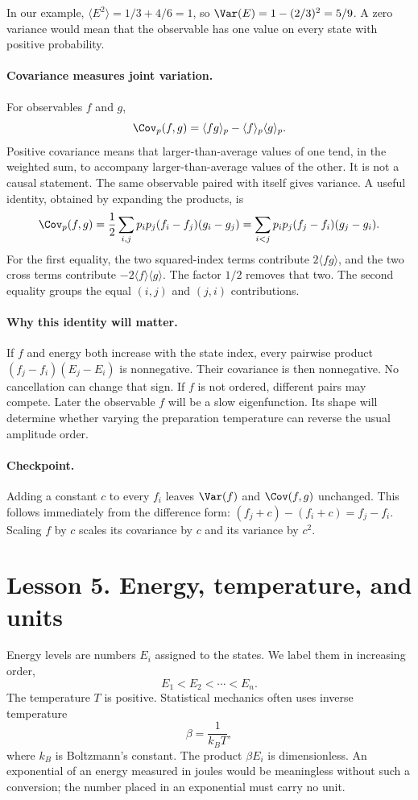 In our example, $\langle E^2\rangle=1/3+4/6=1$, so
$\Var(E)=1-(2/3)^2=5/9$. A zero variance would mean that the observable has
one value on every state with positive probability.

\paragraph{Covariance measures joint variation.}
For observables $f$ and $g$,
\[
\Cov_p(f,g)=\langle fg\rangle_p-\langle f\rangle_p\langle g\rangle_p.
\]
Positive covariance means that larger-than-average values of one tend, in the
weighted sum, to accompany larger-than-average values of the other. It is not
a causal statement. The same observable paired with itself gives variance.
A useful identity, obtained by expanding the products, is
\[
\Cov_p(f,g)=\frac12\sum_{i,j}p_ip_j(f_i-f_j)(g_i-g_j)
=\sum_{i<j}p_ip_j(f_j-f_i)(g_j-g_i).
\]
For the first equality, the two squared-index terms contribute
$2\langle fg\rangle$, and the two cross terms contribute
$-2\langle f\rangle\langle g\rangle$. The factor $1/2$ removes that two.
The second equality groups the equal $(i,j)$ and $(j,i)$ contributions.

\paragraph{Why this identity will matter.}
If $f$ and energy both increase with the state index, every pairwise product
$(f_j-f_i)(E_j-E_i)$ is nonnegative. Their covariance is then nonnegative.
No cancellation can change that sign. If $f$ is not ordered, different pairs
may compete. Later the observable $f$ will be a slow eigenfunction. Its shape
will determine whether varying the preparation temperature can reverse the
usual amplitude order.

\paragraph{Checkpoint.}
Adding a constant $c$ to every $f_i$ leaves $\Var(f)$ and $\Cov(f,g)$ unchanged.
This follows immediately from the difference form: $(f_j+c)-(f_i+c)=f_j-f_i$.
Scaling $f$ by $c$ scales its covariance by $c$ and its variance by $c^2$.

\clearpage
\section*{Lesson 5. Energy, temperature, and units}
Energy levels are numbers $E_i$ assigned to the states. We label them in
increasing order,
\[
E_1<E_2<\cdots<E_n.
\]
The temperature $T$ is positive. Statistical mechanics often uses inverse
temperature
\[
\beta=\frac{1}{k_B T},
\]
where $k_B$ is Boltzmann's constant. The product $\beta E_i$ is dimensionless.
An exponential of an energy measured in joules would be meaningless without
such a conversion; the number placed in an exponential must carry no unit.

